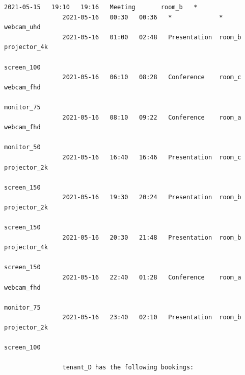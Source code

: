 \documentclass{article}
\begin{document}
\begin{Verbatim}[gobble=8]
                2021-05-15   19:10   19:16   Meeting       room_b   *
                2021-05-16   00:30   00:36   *             *        webcam_uhd
                2021-05-16   01:00   02:48   Presentation  room_b   projector_4k
                                                                    screen_100
                2021-05-16   06:10   08:28   Conference    room_c   webcam_fhd
                                                                    monitor_75
                2021-05-16   08:10   09:22   Conference    room_a   webcam_fhd
                                                                    monitor_50
                2021-05-16   16:40   16:46   Presentation  room_c   projector_2k
                                                                    screen_150
                2021-05-16   19:30   20:24   Presentation  room_b   projector_2k
                                                                    screen_150
                2021-05-16   20:30   21:48   Presentation  room_b   projector_4k
                                                                    screen_150
                2021-05-16   22:40   01:28   Conference    room_a   webcam_fhd
                                                                    monitor_75
                2021-05-16   23:40   02:10   Presentation  room_b   projector_2k
                                                                    screen_100
                
                tenant_D has the following bookings:
                

\end{Verbatim}
\end{document}
